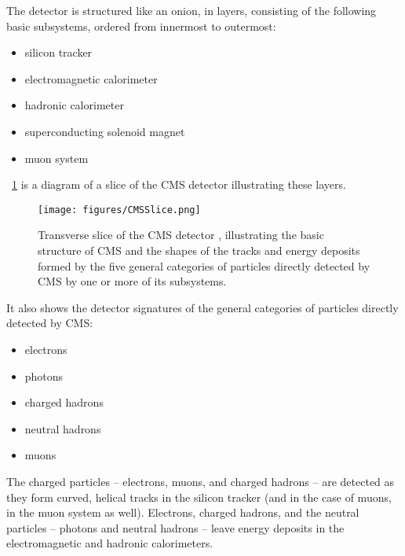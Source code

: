 The detector is structured like an onion, in layers, consisting of the following basic subsystems, ordered from innermost to outermost:
\begin{itemize}
  \item silicon tracker
  \item electromagnetic calorimeter
  \item hadronic calorimeter
  \item superconducting solenoid magnet
  \item muon system
\end{itemize}
\Fig~\ref{cms:interactive} is a diagram of a slice of the CMS detector illustrating these layers.
\begin{figure}[htpb]
  \centering
  \texttt{[image: figures/CMSSlice.png]}
  \caption{Transverse slice of the CMS detector \cite{Davis:2205172}, illustrating the basic structure of CMS and the shapes of the tracks and energy deposits formed by the five general categories of particles directly detected by CMS by one or more of its subsystems.}
  \label{cms:interactive}
\end{figure}
It also shows the detector signatures of the general categories of particles directly detected by CMS:
\begin{itemize}
  \item electrons
  \item photons
  \item charged hadrons
  \item neutral hadrons
  \item muons
\end{itemize}
The charged particles -- electrons, muons, and charged hadrons -- are detected as they form curved, helical tracks in the silicon tracker (and in the case of muons, in the muon system as well).
Electrons, charged hadrons, and the neutral particles -- photons and neutral hadrons -- leave energy deposits in the electromagnetic and hadronic calorimeters.

